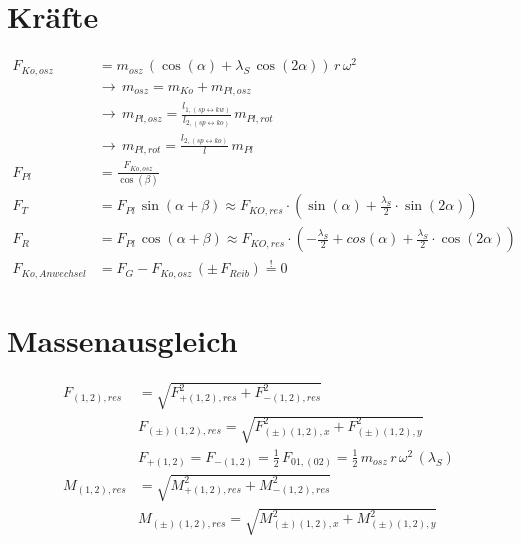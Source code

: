 \documentclass[english,threecolumn,color]{latex4ei/latex4ei_sheet}
\begin{document}
\section{Kräfte}
\begin{sectionbox}
	\begin{align*}
		F_{Ko,osz}&=m_{osz}\,\left( \cos(\alpha)+\lambda_S\,\cos(2\alpha) \right)\,r\,\omega^2\\
		&\rightarrow\,m_{osz}=m_{Ko}+m_{Pl,osz}\\
		&\rightarrow\,m_{Pl,osz}=\frac{l_{1,\left(sp \leftrightarrow kw\right)}}{l_{2,\left(sp \leftrightarrow ko\right)}}\,m_{Pl,rot}\\
		&\rightarrow\,m_{Pl,rot}=\frac{l_{2,\left(sp \leftrightarrow ko\right)}}{l}\,m_{Pl}\\
		F_{Pl}&=\frac{F_{Ko,osz}}{\cos(\beta)}\\
		F_T&=F_{Pl}\,\sin(\alpha+\beta)\approx F_{KO,res}\cdot \left( \sin(\alpha)+\frac{\lambda_S}{2} \cdot \sin(2 \alpha)\right)\\
		F_R&=F_{Pl}\,\cos(\alpha+\beta)\approx F_{KO,res}\cdot\left( -\frac{\lambda_S}{2}+cos(\alpha)+ \frac{\lambda_S}{2}\cdot \cos(2 \alpha)\right)\\
		F_{Ko,Anwechsel}&=F_G-F_{Ko,osz}\,(\pm\,F_{Reib})\overset{\text{!}}{=}0
	\end{align*}

\end{sectionbox}

\section{Massenausgleich}
\begin{sectionbox}
	\begin{align*}
	F_{(1,2),res}&=\sqrt{F_{+(1,2),res}^2+F_{-(1,2),res}^2}\\
	&F_{(\pm)(1,2),res}=\sqrt{F_{(\pm)(1,2),x}^2+F_{(\pm)(1,2),y}^2}\\
	&F_{+(1,2)}=F_{-(1,2)}=\frac{1}{2}\,F_{01,(02)}=\frac{1}{2}\,m_{osz}\,r\,\omega^2\,(\lambda_S)\\
	M_{(1,2),res}&=\sqrt{M_{+(1,2),res}^2+M_{-(1,2),res}^2}\\
	&M_{(\pm)(1,2),res}=\sqrt{M_{(\pm)(1,2),x}^2+M_{(\pm)(1,2),y}^2}
	\end{align*}
\end{sectionbox}
\end{document}

